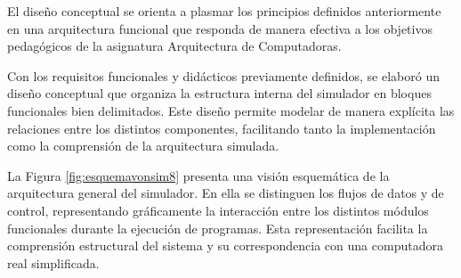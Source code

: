 \documentclass[12pt,oneside]{templates/unerthesis}
\begin{document}
\begin{table}[!h]
\centering
\caption{\label{tab:comparativa-vonsim}Comparación entre VonSim y VonSim8}
\centering
{}
\end{table}

El diseño conceptual se orienta a plasmar los principios definidos anteriormente en una arquitectura funcional que responda de manera efectiva a los objetivos pedagógicos de la asignatura Arquitectura de Computadoras.

Con los requisitos funcionales y didácticos previamente definidos, se elaboró un diseño conceptual que organiza la estructura interna del simulador en bloques funcionales bien delimitados. Este diseño permite modelar de manera explícita las relaciones entre los distintos componentes, facilitando tanto la implementación como la comprensión de la arquitectura simulada.

La Figura \ref{fig:esquemavonsim8} presenta una visión esquemática de la arquitectura general del simulador. En ella se distinguen los flujos de datos y de control, representando gráficamente la interacción entre los distintos módulos funcionales durante la ejecución de programas. Esta representación facilita la comprensión estructural del sistema y su correspondencia con una computadora real simplificada.
\end{document}
